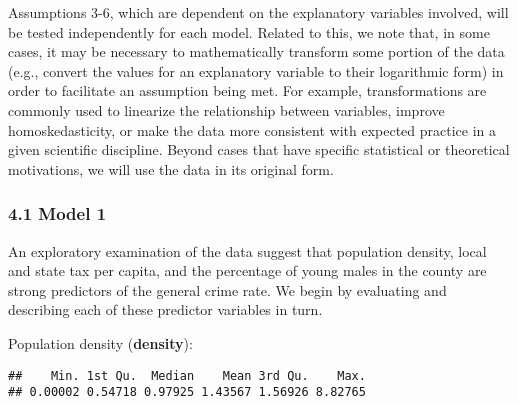 \documentclass[]{article}
\newenvironment{Shaded}{\begin{snugshade}}{\end{snugshade}}
\newcommand{\KeywordTok}[1]{\textcolor[rgb]{0.13,0.29,0.53}{\textbf{#1}}}
\newcommand{\DataTypeTok}[1]{\textcolor[rgb]{0.13,0.29,0.53}{#1}}
\newcommand{\DecValTok}[1]{\textcolor[rgb]{0.00,0.00,0.81}{#1}}
\newcommand{\StringTok}[1]{\textcolor[rgb]{0.31,0.60,0.02}{#1}}
\newcommand{\OperatorTok}[1]{\textcolor[rgb]{0.81,0.36,0.00}{\textbf{#1}}}
\newcommand{\NormalTok}[1]{#1}
\begin{document}
Assumptions 3-6, which are dependent on the explanatory variables
involved, will be tested independently for each model. Related to this,
we note that, in some cases, it may be necessary to mathematically
transform some portion of the data (e.g., convert the values for an
explanatory variable to their logarithmic form) in order to facilitate
an assumption being met. For example, transformations are commonly used
to linearize the relationship between variables, improve
homoskedasticity, or make the data more consistent with expected
practice in a given scientific discipline. Beyond cases that have
specific statistical or theoretical motivations, we will use the data in
its original form.

\subsubsection{4.1 Model 1}\label{model-1}

An exploratory examination of the data suggest that population density,
local and state tax per capita, and the percentage of young males in the
county are strong predictors of the general crime rate. We begin by
evaluating and describing each of these predictor variables in turn.

Population density (\textbf{density}):

\begin{Shaded}
\end{Shaded}

\begin{verbatim}
##    Min. 1st Qu.  Median    Mean 3rd Qu.    Max. 
## 0.00002 0.54718 0.97925 1.43567 1.56926 8.82765
\end{verbatim}

\begin{Shaded}
\end{Shaded}
\end{document}

